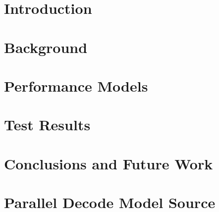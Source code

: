\documentclass[]{article}
\begin{document}
\clearpage

\vspace*{\fill}
\begin{abstract}
\end{abstract}
\vspace*{\fill}

\clearpage

\tableofcontents

\clearpage

\section{Introduction}


\section{Background}


\section{Performance Models}


\section{Test Results}


\section{Conclusions and Future Work}





\appendix

\section{Parallel Decode Model Source}
\label{app:decode-model-source}

 
\end{document}
